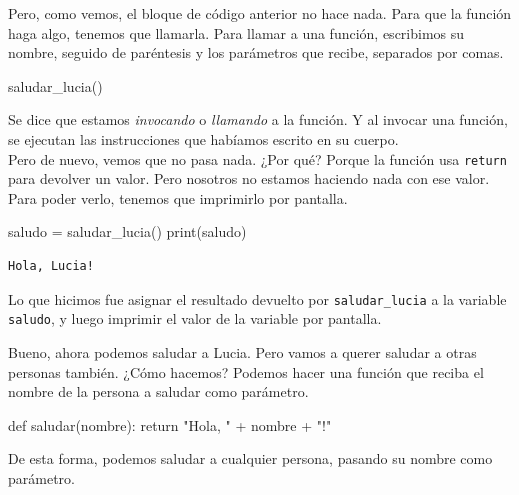 \documentclass[
  letterpaper,
  DIV=11,
  numbers=noendperiod]{scrreprt}
\newenvironment{Shaded}{\begin{snugshade}}{\end{snugshade}}
\newcommand{\BuiltInTok}[1]{\textcolor[rgb]{0.00,0.23,0.31}{#1}}
\newcommand{\ControlFlowTok}[1]{\textcolor[rgb]{0.00,0.23,0.31}{#1}}
\newcommand{\KeywordTok}[1]{\textcolor[rgb]{0.00,0.23,0.31}{#1}}
\newcommand{\NormalTok}[1]{\textcolor[rgb]{0.00,0.23,0.31}{#1}}
\newcommand{\OperatorTok}[1]{\textcolor[rgb]{0.37,0.37,0.37}{#1}}
\newcommand{\StringTok}[1]{\textcolor[rgb]{0.13,0.47,0.30}{#1}}
\begin{document}
Pero, como vemos, el bloque de código anterior no hace nada. Para que la
función haga algo, tenemos que llamarla. Para llamar a una función,
escribimos su nombre, seguido de paréntesis y los parámetros que recibe,
separados por comas.

\begin{Shaded}
\begin{Highlighting}[]
\NormalTok{saludar\_lucia()}
\end{Highlighting}
\end{Shaded}

Se dice que estamos \emph{invocando} o \emph{llamando} a la función. Y
al invocar una función, se ejecutan las instrucciones que habíamos
escrito en su cuerpo.\\

Pero de nuevo, vemos que no pasa nada. ¿Por qué? Porque la función usa
\texttt{return} para devolver un valor. Pero nosotros no estamos
haciendo nada con ese valor. Para poder verlo, tenemos que imprimirlo
por pantalla.

\begin{Shaded}
\begin{Highlighting}[]
\NormalTok{saludo }\OperatorTok{=}\NormalTok{ saludar\_lucia()}
\BuiltInTok{print}\NormalTok{(saludo)}
\end{Highlighting}
\end{Shaded}

\begin{verbatim}
Hola, Lucia!
\end{verbatim}

Lo que hicimos fue asignar el resultado devuelto por
\texttt{saludar\_lucia} a la variable \texttt{saludo}, y luego imprimir
el valor de la variable por pantalla.

Bueno, ahora podemos saludar a Lucia. Pero vamos a querer saludar a
otras personas también. ¿Cómo hacemos? Podemos hacer una función que
reciba el nombre de la persona a saludar como parámetro.

\begin{Shaded}
\begin{Highlighting}[]
\KeywordTok{def}\NormalTok{ saludar(nombre):}
  \ControlFlowTok{return} \StringTok{"Hola, "} \OperatorTok{+}\NormalTok{ nombre }\OperatorTok{+} \StringTok{"!"}
\end{Highlighting}
\end{Shaded}

De esta forma, podemos saludar a cualquier persona, pasando su nombre
como parámetro.
\end{document}
